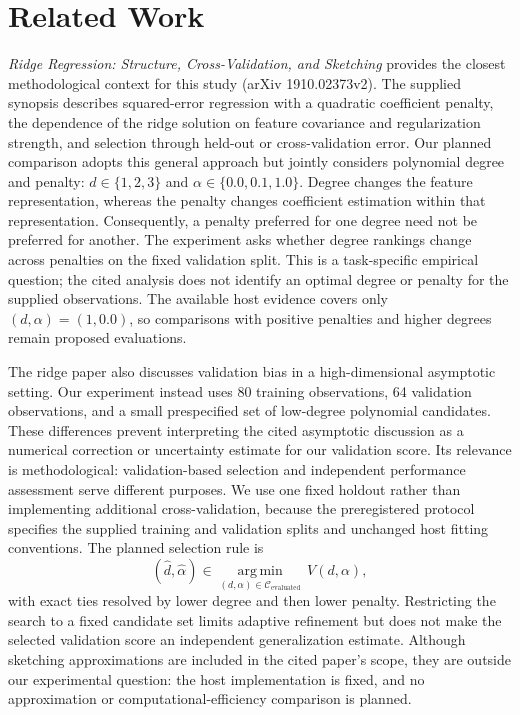 \documentclass[11pt]{article}
\begin{document}
\section{Related Work}
\emph{Ridge Regression: Structure, Cross-Validation, and Sketching} provides the closest methodological context for this study (arXiv 1910.02373v2). The supplied synopsis describes squared-error regression with a quadratic coefficient penalty, the dependence of the ridge solution on feature covariance and regularization strength, and selection through held-out or cross-validation error. Our planned comparison adopts this general approach but jointly considers polynomial degree and penalty: \(d\in\{1,2,3\}\) and \(\alpha\in\{0.0,0.1,1.0\}\). Degree changes the feature representation, whereas the penalty changes coefficient estimation within that representation. Consequently, a penalty preferred for one degree need not be preferred for another. The experiment asks whether degree rankings change across penalties on the fixed validation split. This is a task-specific empirical question; the cited analysis does not identify an optimal degree or penalty for the supplied observations. The available host evidence covers only \((d,\alpha)=(1,0.0)\), so comparisons with positive penalties and higher degrees remain proposed evaluations.

The ridge paper also discusses validation bias in a high-dimensional asymptotic setting. Our experiment instead uses 80 training observations, 64 validation observations, and a small prespecified set of low-degree polynomial candidates. These differences prevent interpreting the cited asymptotic discussion as a numerical correction or uncertainty estimate for our validation score. Its relevance is methodological: validation-based selection and independent performance assessment serve different purposes. We use one fixed holdout rather than implementing additional cross-validation, because the preregistered protocol specifies the supplied training and validation splits and unchanged host fitting conventions. The planned selection rule is
\[
(\widehat d,\widehat\alpha)
\in
\underset{(d,\alpha)\in\mathcal C_{\mathrm{evaluated}}}
{\operatorname{arg\,min}}
\,V(d,\alpha),
\]
with exact ties resolved by lower degree and then lower penalty. Restricting the search to a fixed candidate set limits adaptive refinement but does not make the selected validation score an independent generalization estimate. Although sketching approximations are included in the cited paper's scope, they are outside our experimental question: the host implementation is fixed, and no approximation or computational-efficiency comparison is planned.
\end{document}
